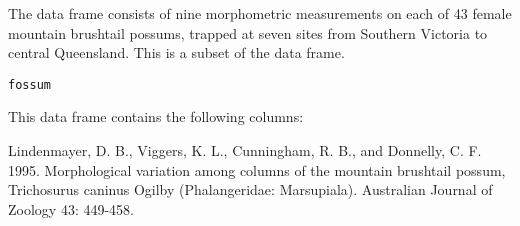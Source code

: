 \begin{Description}\relax
The  data frame consists of nine morphometric
measurements on each of 43 female mountain brushtail possums, trapped
at seven sites from Southern Victoria to central Queensland.
This is a subset of the  data frame.
\end{Description}
\begin{Usage}
\begin{verbatim}fossum\end{verbatim}
\end{Usage}
\begin{Format}\relax
This data frame contains the following columns:
\end{Format}
\begin{Source}\relax
Lindenmayer, D. B., Viggers, K. L., Cunningham, R. B., and
Donnelly, C. F. 1995. Morphological variation among columns of the
mountain brushtail possum, Trichosurus caninus Ogilby
(Phalangeridae: Marsupiala). Australian Journal of Zoology 43:
449-458.
\end{Source}
\begin{Examples}
\end{Examples}

